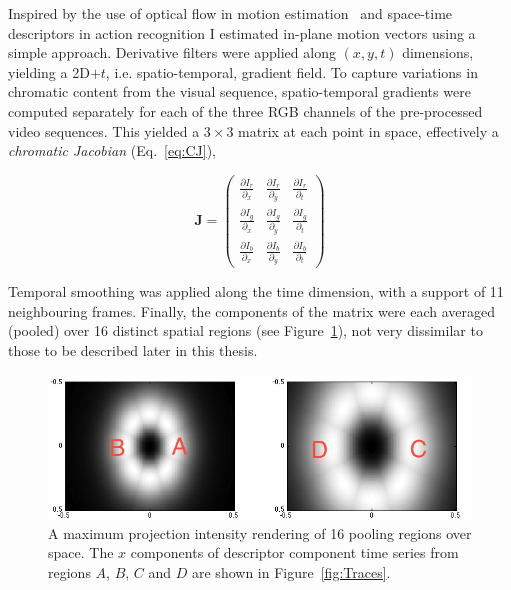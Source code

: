 Inspired by the use of optical flow in motion estimation~\citep{Weickert2006} and space-time descriptors in action recognition \citep{Wang2009} I estimated in-plane motion vectors using a simple approach.  Derivative filters were applied along $(x,y,t)$ dimensions, yielding a 2D$+t$, i.e. spatio-temporal, gradient field.  To capture variations in chromatic content from the visual sequence, spatio-temporal gradients were computed separately for each of the three RGB channels of the pre-processed video sequences.  This yielded a $3\times 3$ matrix at each point in space, effectively a \textit{chromatic Jacobian} (Eq.~\ref{eq:CJ}),	  

\begin{equation}
\mathbf{J} = \left (
\begin{array}{ccc}
\frac{\partial I_r}{\partial_x} & \frac{\partial I_r}{\partial_y}   & \frac{\partial I_r}{\partial_t} \\
\frac{\partial I_g}{\partial_x}   & \frac{\partial I_g}{\partial_y}  &  \frac{\partial I_g}{\partial_t} \\
\frac{\partial I_b}{\partial_x}  & \frac{\partial  I_b}{\partial_y}  &  \frac{\partial I_b}{\partial_t}
\end{array}
\right ) 
\label{eq:CJ}
\end{equation}

Temporal smoothing was applied along the time dimension, with a support of 11 neighbouring frames. Finally, the components of the matrix were each averaged (pooled) over 16 distinct spatial regions (see Figure~\ref{fig:pooling4lwcolor}), not very dissimilar to those to be described later in this thesis. 



\begin{figure}[h!]
\centering
\includegraphics[width=\linewidth]{./gfx/Chapter04/pooling_lwcolor.png}
\caption{A maximum projection intensity rendering of 16 pooling regions over space. The $x$ components of descriptor component time series from regions $A$, $B$, $C$ and $D$ are shown in Figure~\ref{fig:Traces}.}
\label{fig:pooling4lwcolor}
\end{figure}


